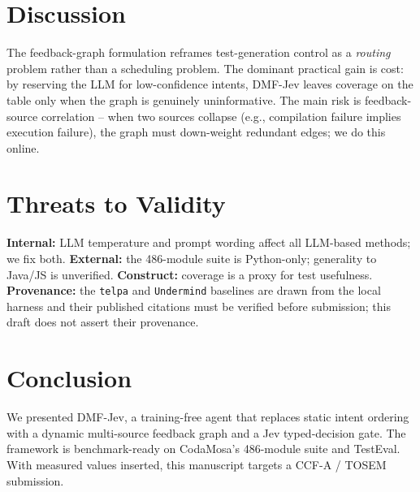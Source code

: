 \documentclass[11pt]{article}
\begin{document}
\section{Discussion}
The feedback-graph formulation reframes test-generation control as a \emph{routing} problem rather than a scheduling problem. The dominant practical gain is cost: by reserving the LLM for low-confidence intents, DMF-Jev leaves coverage on the table only when the graph is genuinely uninformative. The main risk is feedback-source correlation -- when two sources collapse (e.g., compilation failure implies execution failure), the graph must down-weight redundant edges; we do this online.

\section{Threats to Validity}
\label{sec:threats}
\textbf{Internal:} LLM temperature and prompt wording affect all LLM-based methods; we fix both. \textbf{External:} the 486-module suite is Python-only; generality to Java/JS is unverified. \textbf{Construct:} coverage is a proxy for test usefulness. \textbf{Provenance:} the \texttt{telpa} and \texttt{Undermind} baselines are drawn from the local harness and their published citations must be verified before submission; this draft does not assert their provenance.

\section{Conclusion}
We presented DMF-Jev, a training-free agent that replaces static intent ordering with a dynamic multi-source feedback graph and a Jev typed-decision gate. The framework is benchmark-ready on CodaMosa's 486-module suite and TestEval. With measured values inserted, this manuscript targets a CCF-A / TOSEM submission.
\end{document}
